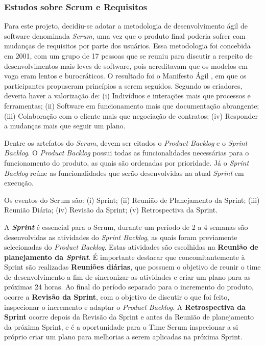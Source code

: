 \subsubsection{Estudos sobre Scrum e Requisitos} 
Para este projeto, decidiu-se adotar a metodologia de desenvolvimento ágil de software denominada \textit{Scrum}, uma vez que o produto final poderia sofrer com mudanças de requisitos por parte dos usuários. Essa metodologia foi concebida em 2001, com um grupo de 17 pessoas que se reuniu para discutir a respeito de desenvolvimentos mais leves de software, pois acreditavam que os modelos em voga eram lentos e burocráticos. O resultado foi o Manifesto Ágil \citep{agileManifesto}, em que os participantes propuseram princípios a serem seguidos. Segundo os criadores, deveria haver a valorização de: (i) Indivíduos e interações mais que processos e ferramentas; (ii) Software em funcionamento mais que documentação abrangente; (iii) Colaboração com o cliente mais que negociação de contratos; (iv) Responder a mudanças mais que seguir um plano.

Dentre os artefatos do \textit{Scrum}, devem ser citados o \textit{Product Backlog} e o \textit{Sprint Backlog}. O \textit{Product Backlog} possui todas as funcionalidades necessárias para o funcionamento do produto, as quais são ordenadas por prioridade. Já o \textit{Sprint Backlog} reúne as funcionalidades que serão desenvolvidas na atual \textit{Sprint} em execução.

Os eventos do Scrum são: (i) Sprint; (ii) Reunião de Planejamento da Sprint; (iii) Reunião Diária; (iv) Revisão da Sprint; (v) Retrospectiva da Sprint.

A \textbf{\textit{Sprint}} é essencial para o Scrum, durante um período de 2 a 4 semanas são desenvolvidas as atividades do \textit{Sprint Backlog}, as quais foram previamente selecionadas do \textit{Product Backlog}. Estas atividades são escolhidas na \textbf{Reunião de planejamento da \textit{Sprint}}. É importante destacar que concomitantemente à Sprint são realizadas \textbf{Reuniões diárias}, que possuem o objetivo de reunir o time de desenvolvimento a fim de sincronizar as atividades e criar um plano para as próximas 24 horas. Ao final do período separado para o incremento do produto, ocorre a \textbf{Revisão da Sprint}, com o objetivo de discutir o que foi feito, inspecionar o incremento e adaptar o \textit{Product Backlog}. A \textbf{Retrospectiva da Sprint} ocorre depois da Revisão da Sprint e antes da Reunião de planejamento da próxima Sprint, e é a oportunidade para o Time Scrum inspecionar a si próprio criar um plano para melhorias a serem aplicadas na próxima Sprint.

